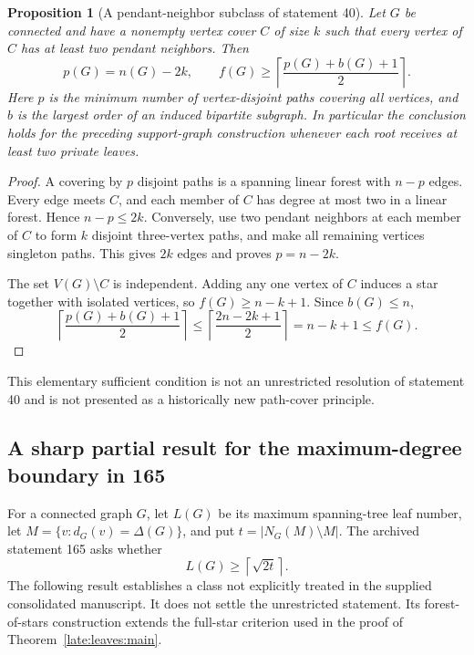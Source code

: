 \documentclass[11pt,a4paper]{article}
\newtheorem{proposition}[theorem]{Proposition}
\theoremstyle{definition}\newtheorem{definition}[theorem]{Definition}
\theoremstyle{remark}\newtheorem{remark}[theorem]{Remark}
\begin{document}
\begin{proposition}[A pendant-neighbor subclass of statement 40]
\label{r12support:forty}
Let $G$ be connected and have a nonempty vertex cover $C$ of size $k$ such that
every vertex of $C$ has at least two pendant neighbors. Then
\[
 p(G)=n(G)-2k,\qquad
 f(G)\ge\left\lceil\frac{p(G)+b(G)+1}{2}\right\rceil.
\]
Here $p$ is the minimum number of vertex-disjoint paths covering all
vertices, and $b$ is the largest order of an induced bipartite subgraph.
In particular the conclusion holds for the preceding support-graph
construction whenever each root receives at least two private leaves.
\end{proposition}
\begin{proof}
A covering by $p$ disjoint paths is a spanning linear forest with
$n-p$ edges. Every edge meets $C$, and each member of $C$ has degree
at most two in a linear forest. Hence $n-p\le2k$. Conversely, use
two pendant neighbors at each member of $C$ to form $k$ disjoint
three-vertex paths, and make all remaining vertices singleton paths.
This gives $2k$ edges and proves $p=n-2k$.

The set $V(G)\setminus C$ is independent. Adding any one vertex of
$C$ induces a star together with isolated vertices, so
$f(G)\ge n-k+1$. Since $b(G)\le n$,
\[
 \left\lceil\frac{p(G)+b(G)+1}{2}\right\rceil
 \le\left\lceil\frac{2n-2k+1}{2}\right\rceil
 =n-k+1\le f(G).
\]
\end{proof}
This elementary sufficient condition is not an unrestricted resolution
of statement 40 and is not presented as a historically new path-cover
principle.


\subsection{A sharp partial result for the maximum-degree boundary in 165}
\label{r12leaf:sec165}
For a connected graph $G$, let $L(G)$ be its maximum spanning-tree
leaf number, let $M=\{v:d_G(v)=\Delta(G)\}$, and put
$t=|N_G(M)\setminus M|$. The archived statement 165 asks whether
\[
 L(G)\geq\left\lceil\sqrt{2t}\right\rceil.
\]
The following result establishes a class not explicitly treated in the
supplied consolidated manuscript. It does not settle the unrestricted
statement. Its forest-of-stars construction extends the full-star
criterion used in the proof of Theorem~\ref{late:leaves:main}.
\end{document}
